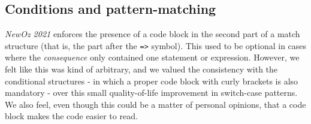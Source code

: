 \subsection{Conditions and pattern-matching}
\textit{NewOz 2021} enforces the presence of a code block in the second part of a match structure (that is, the part after the \texttt{=>} symbol).
This used to be optional in cases where the \textit{consequence} only contained one statement or expression.
However, we felt like this was kind of arbitrary, and we valued the consistency with the conditional structures - in which a proper code block with curly brackets is also mandatory - over this small quality-of-life improvement in switch-case patterns.
We also feel, even though this could be a matter of personal opinions, that a code block makes the code easier to read.\newline

